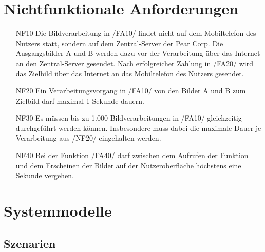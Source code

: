 \documentclass[parskip=full]{scrartcl}
\begin{document}
\section{Nichtfunktionale Anforderungen}
\begin{itemize}[nosep]
\item[NF10] Die Bildverarbeitung in /FA10/ findet nicht auf dem Mobiltelefon des Nutzers statt, sondern auf dem Zentral-Server der Pear Corp. Die Ausgangsbilder A und B werden dazu vor der Verarbeitung über das Internet an den Zentral-Server gesendet. Nach erfolgreicher Zahlung in /FA20/ wird das Zielbild über das Internet an das Mobiltelefon des Nutzers gesendet.
\item[NF20] Ein Verarbeitungsvorgang in /FA10/ von den Bilder A und B zum Zielbild darf maximal 1 Sekunde dauern.
\item[NF30] Es müssen bis zu 1.000 Bildverarbeitungen in /FA10/ gleichzeitig durchgeführt werden können. Insbesondere muss dabei die maximale Dauer je Verarbeitung aus /NF20/ eingehalten werden.
\item[NF40] Bei der Funktion /FA40/ darf zwischen dem Aufrufen der Funktion und dem Erscheinen der Bilder auf der Nutzeroberfläche höchstens eine Sekunde vergehen. 
\end{itemize}

\section{Systemmodelle}

\subsection{Szenarien}
\end{document}
